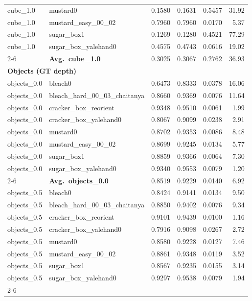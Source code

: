 \begin{longtable}{llrrrr}
  cube_1.0 & mustard0 & 0.1580 & 0.1631 & 0.5457 & 31.92 \\
  cube_1.0 & mustard\_easy\_00\_02 & 0.7960 & 0.7960 & 0.0170 & 5.37 \\
  cube_1.0 & sugar\_box1 & 0.1269 & 0.1280 & 0.4521 & 77.29 \\
  cube_1.0 & sugar\_box\_yalehand0 & 0.4575 & 0.4743 & 0.0616 & 19.02 \\
  \cmidrule{2-6}
  & \textbf{Avg.~cube_1.0} & 0.3025 & 0.3067 & 0.2762 & 36.93 \\
  \midrule
\multicolumn{6}{l}{\textbf{Objects (GT depth)}} \\
\midrule
  objects_0.0 & bleach0 & 0.6473 & 0.8333 & 0.0378 & 16.06 \\
  objects_0.0 & bleach\_hard\_00\_03\_chaitanya & 0.8660 & 0.9369 & 0.0076 & 11.64 \\
  objects_0.0 & cracker\_box\_reorient & 0.9348 & 0.9510 & 0.0061 & 1.99 \\
  objects_0.0 & cracker\_box\_yalehand0 & 0.8067 & 0.9099 & 0.0238 & 2.91 \\
  objects_0.0 & mustard0 & 0.8702 & 0.9353 & 0.0086 & 8.48 \\
  objects_0.0 & mustard\_easy\_00\_02 & 0.8699 & 0.9245 & 0.0134 & 5.77 \\
  objects_0.0 & sugar\_box1 & 0.8859 & 0.9366 & 0.0064 & 7.30 \\
  objects_0.0 & sugar\_box\_yalehand0 & 0.9340 & 0.9553 & 0.0079 & 1.20 \\
  \cmidrule{2-6}
  & \textbf{Avg.~objects_0.0} & 0.8519 & 0.9229 & 0.0140 & 6.92 \\
  \midrule
  objects_0.5 & bleach0 & 0.8424 & 0.9141 & 0.0134 & 9.50 \\
  objects_0.5 & bleach\_hard\_00\_03\_chaitanya & 0.8850 & 0.9402 & 0.0076 & 9.34 \\
  objects_0.5 & cracker\_box\_reorient & 0.9101 & 0.9439 & 0.0100 & 1.16 \\
  objects_0.5 & cracker\_box\_yalehand0 & 0.7916 & 0.9098 & 0.0267 & 2.72 \\
  objects_0.5 & mustard0 & 0.8580 & 0.9228 & 0.0127 & 7.46 \\
  objects_0.5 & mustard\_easy\_00\_02 & 0.8861 & 0.9348 & 0.0119 & 3.52 \\
  objects_0.5 & sugar\_box1 & 0.8567 & 0.9235 & 0.0155 & 3.14 \\
  objects_0.5 & sugar\_box\_yalehand0 & 0.9297 & 0.9538 & 0.0079 & 1.94 \\
  \cmidrule{2-6}

\end{longtable}
